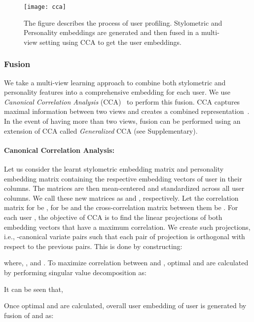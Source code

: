 \documentclass[11pt]{article}
\begin{document}
{\begin{figure}[t] 
	\centering 
	\texttt{[image: cca]}   
	\caption[]{\footnotesize The figure describes the process of user profiling. Stylometric and Personality embeddings are generated and then fused in a multi-view setting using CCA to get the user embeddings.}
	\label{fig:cca}
    \vspace{-0.4cm}
 \end{figure}
 
 
\subsubsection{Fusion} \label{sec:fusion}
We take a multi-view learning approach to combine both stylometric and personality features into a comprehensive embedding for each user. We use \textit{Canonical Correlation Analysis} (CCA)~\cite{hotelling1936relations} to perform this fusion. CCA captures maximal information between two views and creates a combined representation~\cite{hardoon2004canonical,benton2016learning}. In the event of having more than two views, fusion can be performed using an extension of CCA called \textit{Generalized} CCA (see Supplementary).

\paragraph{Canonical Correlation Analysis:}
Let us consider the learnt stylometric embedding matrix  and personality embedding matrix   containing the respective embedding vectors of user  in their  columns. The matrices are then mean-centered and standardized across all user columns. We call these new matrices as 
 and , respectively. Let the correlation matrix for  be  , for   be  and  the cross-correlation matrix between them be . For each user , the objective of CCA is to find the linear projections of both embedding vectors that have a maximum correlation. We create  such projections, i.e., -canonical variate pairs such that each pair of projection is orthogonal with respect to the previous pairs. This is done by constructing:

where, ,  and . To maximize correlation between  and , optimal  and  are calculated by performing singular value decomposition as:

It can be seen that,

Once optimal  and  are calculated, overall user embedding  of user  is generated by fusion of  and  as: 


}
\end{document}
